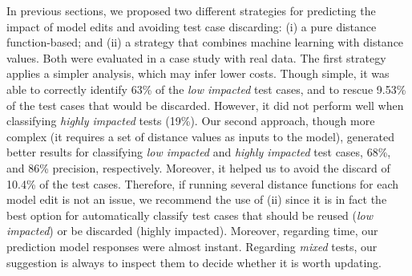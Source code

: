 In previous sections, we proposed two different strategies for predicting the impact of model edits and avoiding test case discarding: (i) a pure distance function-based; and (ii) a strategy that combines machine learning with distance values. Both were evaluated in a case study with real data. The first strategy applies a simpler analysis, which may infer lower costs. Though simple, it was able to correctly identify 63\% of the \textit{low impacted} test cases, and to rescue 9.53\% of the test cases that would be discarded. However, it did not perform well when classifying \textit{highly impacted} tests (19\%). Our second approach, though more complex (it requires a set of distance values as inputs to the model), generated better results for classifying \textit{low impacted} and \textit{highly impacted} test cases, 68\%, and 86\% precision, respectively. Moreover, it helped us to avoid the discard of 10.4\% of the test cases. Therefore, if running several distance functions for each model edit is not an issue, we recommend the use of (ii) since it is in fact the best option for automatically classify test cases that should be reused (\textit{low impacted}) or be discarded (highly impacted). Moreover, regarding time, our prediction model responses were almost instant. Regarding \textit{mixed} tests, our suggestion is always to inspect them to decide whether it is worth updating.